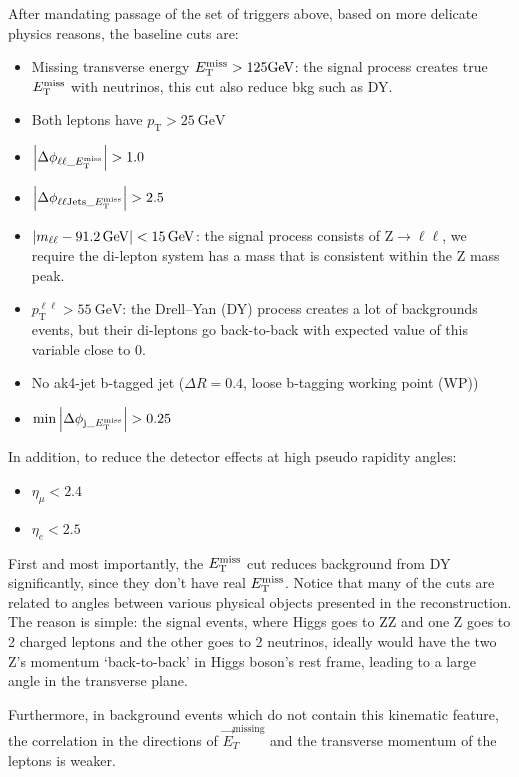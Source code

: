After mandating passage of the set of triggers above, based on more delicate physics reasons, 
the baseline cuts are:
\begin{itemize}
    \item Missing transverse energy $E_{\mathrm{T}}^{\mathrm{miss}} > 125 \si{\giga\electronvolt}$:
        the signal process creates true $E_{\mathrm{T}}^{\mathrm{miss}}$ with neutrinos, this cut also reduce bkg such
        as DY.
    \item Both leptons have $p_\mathrm{T} > \SI{25}{\giga\electronvolt}$
    \item $\abs{\Delta\phi_{\ell\ell\_E_{\mathrm{T}}^{\mathrm{miss}}}} > 1.0$
    \item $\abs{\Delta\phi_{\ell\ell\mathrm{Jets}\_E_{\mathrm{T}}^{\mathrm{miss}}}} > 2.5$
    \item $\abs{m_{\ell\ell} - \SI{91.2}{\giga\electronvolt}} < \SI{15}{\giga\electronvolt}$:
        the signal process consists of $\mathrm{Z}\rightarrow{}\ell\ell$, we
        require the di-lepton system has a mass that is consistent within the Z mass peak.
    \item $p_\mathrm{T}^{\ell\ell} > \SI{55}{\giga\electronvolt} $: 
        the Drell–Yan (DY) process creates a lot of backgrounds events, but their di-leptons
        go back-to-back with expected value of this variable close to 0.
    \item No ak4-jet b-tagged jet ($\Delta{}R=0.4$, loose b-tagging working point (WP))
    \item $\min{\abs{ \Delta\phi_{\mathrm{j}\_E_{\mathrm{T}}^{\mathrm{miss}}}}} > 0.25$
\end{itemize}
In addition, to reduce the detector effects at high pseudo rapidity angles:
\begin{itemize}
    \item $\eta_\mu< 2.4$
    \item $\eta_e< 2.5$
\end{itemize}

First and most importantly, the $E_{\mathrm{T}}^{\mathrm{miss}}$ cut reduces background from DY significantly, since they don't have
real $E_{\mathrm{T}}^{\mathrm{miss}}$.  Notice that many of the
cuts are related to angles between various physical objects presented in the
reconstruction. The reason is simple: the signal events, where Higgs goes to ZZ and one Z
goes to 2 charged leptons and the other goes to 2 neutrinos, ideally would have the two Z's momentum
`back-to-back' in Higgs boson's rest frame, leading to a large angle in the transverse plane.

Furthermore, in background events which do not contain this kinematic feature, the
correlation in the directions of $\vec{E}_{T}^\mathrm{missing}$ and the transverse momentum of the leptons is weaker.

